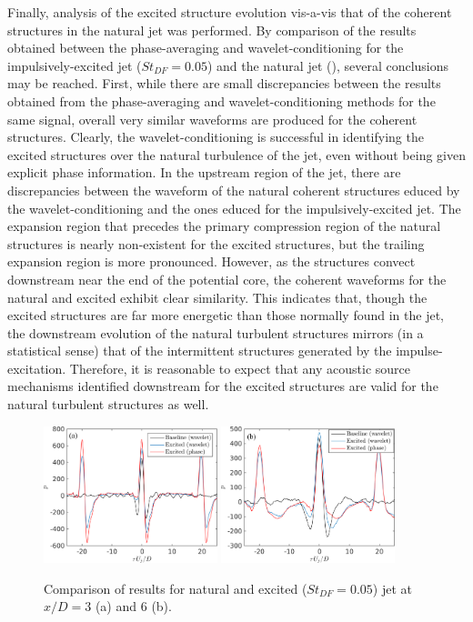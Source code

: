 Finally, analysis of the excited structure evolution vis-a-vis that of the coherent structures in the natural jet was performed.
By comparison of the results obtained between the phase-averaging and wavelet-conditioning for the impulsively-excited jet ($St_{DF} = 0.05$) and the natural jet (), several conclusions may be reached.
First, while there are small discrepancies between the results obtained from the phase-averaging and wavelet-conditioning methods for the same signal, overall very similar waveforms are produced for the coherent structures.
Clearly, the wavelet-conditioning is successful in identifying the excited structures over the natural turbulence of the jet, even without being given explicit phase information.
In the upstream region of the jet, there are discrepancies between the waveform of the natural coherent structures educed by the wavelet-conditioning and the ones educed for the impulsively-excited jet.
The expansion region that precedes the primary compression region of the natural structures is nearly non-existent for the excited structures, but the trailing expansion region is more pronounced.
However, as the structures convect downstream near the end of the potential core, the coherent waveforms for the natural and excited exhibit clear similarity.
This indicates that, though the excited structures are far more energetic than those normally found in the jet, the downstream evolution of the natural turbulent structures mirrors (in a statistical sense) that of the intermittent structures generated by the impulse-excitation.
Therefore, it is reasonable to expect that any acoustic source mechanisms identified downstream for the excited structures are valid for the natural turbulent structures as well.
\begin{figure}
	\centering
	\includegraphics[width=0.45\textwidth]{Figures/conditioning/Phase-wavelet_comparison_x3D_pa.png} %
	\includegraphics[width=0.45\textwidth]{Figures/conditioning/Phase-wavelet_comparison_x6D_pa.png} 
	\caption{Comparison of results for natural and excited ($St_{DF} = 0.05$) jet at $x/D = 3$ (a) and $6$ (b).}
	\label{fig:phase-wavelet_comparison}
\end{figure}

